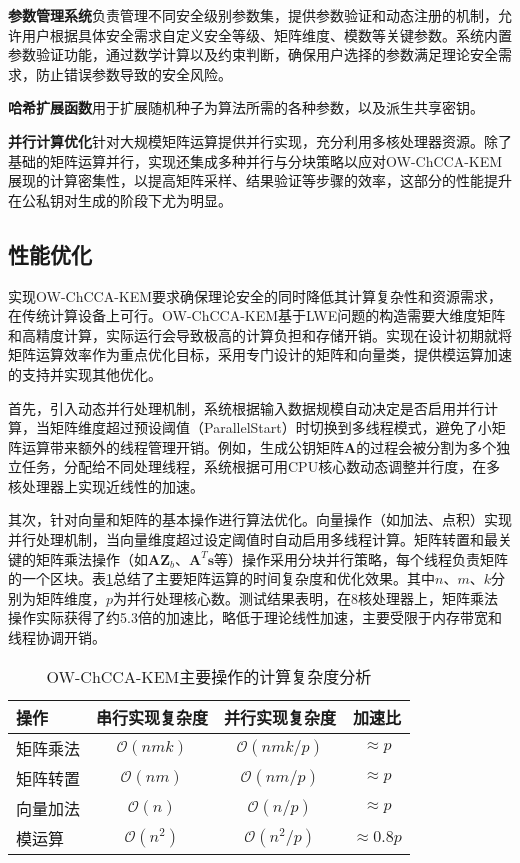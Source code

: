 \textbf{参数管理系统}负责管理不同安全级别参数集，提供参数验证和动态注册的机制，允许用户根据具体安全需求自定义安全等级、矩阵维度、模数等关键参数。系统内置参数验证功能，通过数学计算以及约束判断，确保用户选择的参数满足理论安全需求，防止错误参数导致的安全风险。

\textbf{哈希扩展函数}用于扩展随机种子为算法所需的各种参数，以及派生共享密钥。

\textbf{并行计算优化}针对大规模矩阵运算提供并行实现，充分利用多核处理器资源。除了基础的矩阵运算并行，实现还集成多种并行与分块策略以应对OW-ChCCA-KEM展现的计算密集性，以提高矩阵采样、结果验证等步骤的效率，这部分的性能提升在公私钥对生成的阶段下尤为明显。



\subsection{性能优化}

实现OW-ChCCA-KEM要求确保理论安全的同时降低其计算复杂性和资源需求，在传统计算设备上可行。OW-ChCCA-KEM基于LWE问题的构造需要大维度矩阵和高精度计算，实际运行会导致极高的计算负担和存储开销。实现在设计初期就将矩阵运算效率作为重点优化目标，采用专门设计的矩阵和向量类，提供模运算加速的支持并实现其他优化。

首先，引入动态并行处理机制，系统根据输入数据规模自动决定是否启用并行计算，当矩阵维度超过预设阈值（ParallelStart）时切换到多线程模式，避免了小矩阵运算带来额外的线程管理开销。例如，生成公钥矩阵$\mathbf{A}$的过程会被分割为多个独立任务，分配给不同处理线程，系统根据可用CPU核心数动态调整并行度，在多核处理器上实现近线性的加速。

其次，针对向量和矩阵的基本操作进行算法优化。向量操作（如加法、点积）实现并行处理机制，当向量维度超过设定阈值时自动启用多线程计算。矩阵转置和最关键的矩阵乘法操作（如$\mathbf{A}\mathbf{Z}_b$、$\mathbf{A}^T\mathbf{s}$等）操作采用分块并行策略，每个线程负责矩阵的一个区块。表\ref{tab:complexity-analysis}总结了主要矩阵运算的时间复杂度和优化效果。其中$n$、$m$、$k$分别为矩阵维度，$p$为并行处理核心数。测试结果表明，在8核处理器上，矩阵乘法操作实际获得了约5.3倍的加速比，略低于理论线性加速，主要受限于内存带宽和线程协调开销。

\begin{table}[ht]
\centering
\caption{OW-ChCCA-KEM主要操作的计算复杂度分析}
\begin{tabular}{|l|c|c|c|}
\hline
\textbf{操作} & \textbf{串行实现复杂度} & \textbf{并行实现复杂度} & \textbf{加速比} \\
\hline
矩阵乘法 & $\mathcal{O}(nmk)$ & $\mathcal{O}(nmk/p)$ & $\approx p$ \\
\hline
矩阵转置 & $\mathcal{O}(nm)$ & $\mathcal{O}(nm/p)$ & $\approx p$ \\
\hline
向量加法 & $\mathcal{O}(n)$ & $\mathcal{O}(n/p)$ & $\approx p$ \\
\hline
模运算 & $\mathcal{O}(n^2)$ & $\mathcal{O}(n^2/p)$ & $\approx 0.8p$ \\
\hline
\end{tabular}
\label{tab:complexity-analysis}
\end{table}

